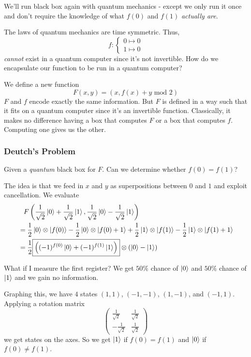 We'll run black box again with quantum mechanics - except we only run it once and don't require the knowledge of what $f(0)$ and $f(1)$ \emph{actually are}.

The laws of quantum mechanics are time symmetric. Thus,
\[f : \begin{cases}
        0\mapsto 0 \\
        1\mapsto 0
    \end{cases}\]
\emph{cannot} exist in a quantum computer since it's not invertible. How do we encapsulate our function to be run in a quantum computer?

We define a new function
\[F(x, y) = (x, f(x) + y \text{ mod } 2)\]
$F$ and $f$ encode exactly the same information. But $F$ is defined in a way such that it fits on a quantum computer since it's an invertible function. Classically, it makes no difference having a box that computes $F$ or a box that computes $f$. Computing one gives us the other.

\subsubsection{Deutch's Problem}
Given a \emph{quantum} black box for $F$. Can we determine whether $f(0) = f(1)$?

The idea is that we feed in $x$ and $y$ as superpositions between $0$ and $1$ and exploit cancellation. We evaluate
\begin{align*}
     & \phantom{=} F\left( \frac{1}{\sqrt{2}}\Ket{0}+\frac{1}{\sqrt{2}}\Ket{1}, \frac{1}{\sqrt{2}}\Ket{0} - \frac{1}{\sqrt{2}}\Ket{1} \right)                                \\
     & = \frac{1}{2} \Ket{0}\otimes \Ket{f(0)} - \frac{1}{2}\Ket{0}\otimes \Ket{f(0) + 1} + \frac{1}{2}\Ket{1}\otimes \Ket{f(1)} - \frac{1}{2}\Ket{1} \otimes \Ket{f(1) + 1} \\
     & = \frac{1}{2}\boxed{\left( (-1)^{f(0)}\Ket{0} + (-1)^{f(1)}\Ket{1} \right)}\otimes \left( \Ket{0} - \Ket{1} \right)
\end{align*}

What if I measure the first register? We get $50\%$ chance of $\Ket{0}$ and $50\%$ chance of $\Ket{1}$ and we gain no information.

Graphing this, we have $4$ states $(1,1)$, $(-1, -1)$, $(1, -1)$, and $(-1, 1)$. Applying a rotation matrix
\[\begin{pmatrix}
        \frac{1}{\sqrt{2}}  & \frac{1}{\sqrt{2}} \\
        -\frac{1}{\sqrt{2}} & \frac{1}{\sqrt{2}}
    \end{pmatrix}\]
we get states on the axes. So we get $\Ket{1}$ if $f(0) = f(1)$ and $\Ket{0}$ if $f(0) \neq f(1)$.